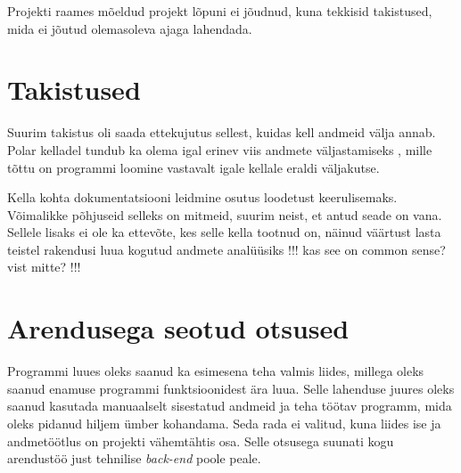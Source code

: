 Projekti raames mõeldud projekt lõpuni ei jõudnud, kuna tekkisid takistused, mida ei jõutud olemasoleva ajaga lahendada.

\section{Takistused}
Suurim takistus oli saada ettekujutus sellest, kuidas kell andmeid välja annab.
Polar kelladel tundub ka olema igal erinev viis andmete väljastamiseks \cite{flowlink-git}, mille tõttu on programmi loomine vastavalt igale kellale eraldi väljakutse.

Kella kohta dokumentatsiooni leidmine osutus loodetust keerulisemaks.
Võimalikke põhjuseid selleks on mitmeid, suurim neist, et antud seade on vana.
Sellele lisaks ei ole ka ettevõte, kes selle kella tootnud on, näinud väärtust lasta teistel rakendusi luua kogutud andmete analüüsiks
!!! kas see on common sense? vist mitte? !!!

\section{Arendusega seotud otsused}
Programmi luues oleks saanud ka esimesena teha valmis liides, millega oleks saanud enamuse programmi funktsioonidest ära luua.
Selle lahenduse juures oleks saanud kasutada manuaalselt sisestatud andmeid ja teha töötav programm, mida oleks pidanud hiljem ümber kohandama.
Seda rada ei valitud, kuna liides ise ja andmetöötlus on projekti vähemtähtis osa.
Selle otsusega suunati kogu arendustöö just tehnilise \textit{back-end} poole peale.

